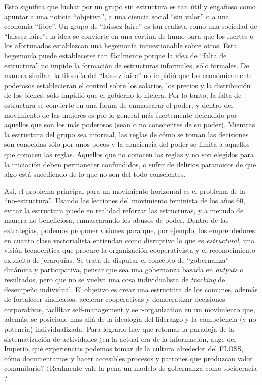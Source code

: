 Esto significa que luchar por un grupo sin estructura es tan útil y engañoso como apuntar a una noticia \enquote{objetiva}, a una ciencia social \enquote{sin valor} o a una economía \enquote{libre}. Un grupo de \enquote{laissez faire} es tan realista como una sociedad de \enquote{laissez faire}; la idea se convierte en una cortina de humo para que los fuertes o los afortunados establezcan una hegemonía incuestionable sobre otros. Esta hegemonía puede establecerse tan fácilmente porque la idea de \enquote{falta de estructura} no impide la formación de estructuras informales, sólo formales. De manera similar, la filosofía del \enquote{laissez faire} no impidió que los económicamente poderosos establecieran el control sobre los salarios, los precios y la distribución de los bienes; sólo impidió que el gobierno lo hiciera. Por lo tanto, la falta de estructura se convierte en una forma de enmascarar el poder, y dentro del movimiento de las mujeres es por lo general más fuertemente defendido por aquellos que son los más poderosos (sean o no conscientes de su poder). Mientras la estructura del grupo sea informal, las reglas de cómo se toman las decisiones son conocidas sólo por unos pocos y la conciencia del poder se limita a aquellos que conocen las reglas. Aquellos que no conocen las reglas y no son elegidos para la iniciación deben permanecer confundidos, o sufrir de delirios paranoicos de que algo está sucediendo de lo que no son del todo conscientes.

Así, el problema principal para un movimiento horizontal es el problema de la \enquote{no-estructura}. Usando las lecciones del movimiento feminista de los años 60, evitar la estructura puede en realidad reforzar las estructuras, y a menudo de manera no beneficiosa, enmascarando los abusos de poder. Dentro de las estrategias, podemos proponer visiones para que, por ejemplo, los emprendedores en cuanto clase vectorialista entiendan como disruptivo \autocite{magazineDisruptiveInnovationsEntrepreneurship2018} lo que es \emph{estructural}, una visión tecnocrítica que procure la organización cooperativista y el reconocimiento explícito de jerarquías. Se trata de disputar el concepto de \enquote{gobernanza} dinámica y participativa, pensar que sea una gobernanza basada en \emph{outputs} o resultados, pero que no se vuelva una cosa individualista de \emph{tracking} de desempeño individual. El objetivo es crear una estructura de los comunes, además de fortalecer sindicatos, acelerar cooperativas y democratizar decisiones corporativas, facilitar self-management y self-organization en un movimiento que, además, se posicione más allá de la ideología del liderazgo y la competencia (y no potencia) individualizada. Para lograrlo hay que retomar la paradoja de la sistematización de actividades ¿en la actual era de la información, auge del Imperio, qué experiencias podemos tomar de la cultura alrededor del FLOSS, cómo documentamos y hacer accesibles procesos y patrones que produzcan valor comunitario? ¿Realmente vale la pena un modelo de gobernanza como sociocracia \autocite{allenParticipatoryOrganizationsPatterns2018}?

